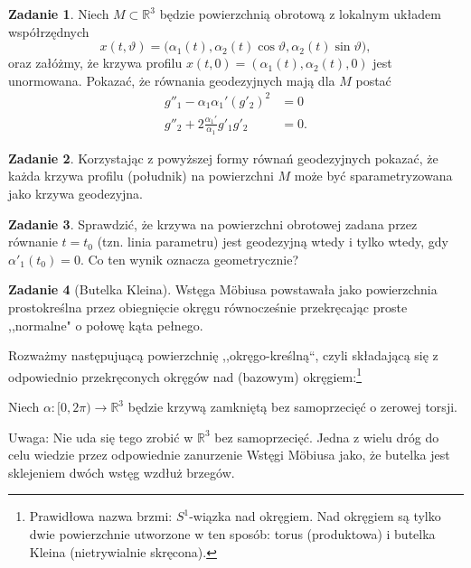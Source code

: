 \documentclass[a4paper,11pt]{article}
\theoremstyle{definition}\newtheorem{exercise}{Zadanie}
\theoremstyle{definition}\newtheorem{remark}{Uwaga}
\begin{document}
\begin{exercise}
Niech $M\subset \mathbb{R}^3$ będzie powierzchnią obrotową z lokalnym układem 
współrzędnych 
\[x(t,\vartheta)=\big(\alpha_1(t),\alpha_2(t)\cos \vartheta ,
\alpha_2(t)\sin\vartheta \big),\]
oraz załóżmy, że krzywa profilu $x(t,0)=(\alpha_1(t),\alpha_2(t),0)$ jest 
unormowana. Pokazać, że r\'ownania geodezyjnych mają dla $M$ postać
\begin{align*}
g''_1-\alpha_1\alpha_1'(g'_2)^2&=0\\
g''_2+2\frac{\alpha_1'}{\alpha_1}g'_1g'_2&=0.
\end{align*}
\end{exercise}

\begin{exercise}
Korzystając z powyższej formy r\'ownań geodezyjnych pokazać, że każda krzywa 
profilu (południk) na powierzchni $M$ może być sparametryzowana jako krzywa 
geodezyjna.
\end{exercise}

\begin{exercise}
Sprawdzić, że krzywa na powierzchni obrotowej zadana przez r\'ownanie 
$t=t_0$ (tzn. linia parametru) jest geodezyjną wtedy i tylko wtedy, gdy 
$\alpha'_1(t_0)=0$. Co ten wynik oznacza geometrycznie?

\end{exercise}




\begin{exercise}[Butelka Kleina]
Wstęga M\"obiusa powstawała jako powierzchnia prostokreślna przez obiegnięcie 
okręgu r\'ownocześnie przekręcając proste ,,normalne" o połowę kąta pełnego.

Rozważmy następujuącą powierzchnię ,,okręgo-kreślną``, czyli składającą się z 
odpowiednio przekręconych okręgów nad (bazowym) okręgiem:\footnote{
Prawidłowa nazwa brzmi: $S^1$-wiązka nad okręgiem. Nad okręgiem są 
tylko dwie powierzchnie utworzone w ten spos\'ob: torus (produktowa) i 
butelka Kleina (nietrywialnie skręcona).}

Niech $\alpha\colon [0,2\pi)\to \mathbb{R}^3$ będzie krzywą zamkniętą bez 
samoprzecięć o zerowej torsji.



\small {Uwaga: Nie uda się tego zrobić w $\mathbb{R}^3$ bez samoprzecięć. 
Jedna z wielu dróg do celu wiedzie przez odpowiednie zanurzenie Wstęgi 
M\"{o}biusa jako, że butelka jest sklejeniem dwóch wstęg wzdłuż brzegów.}
\end{exercise}
\end{document}
